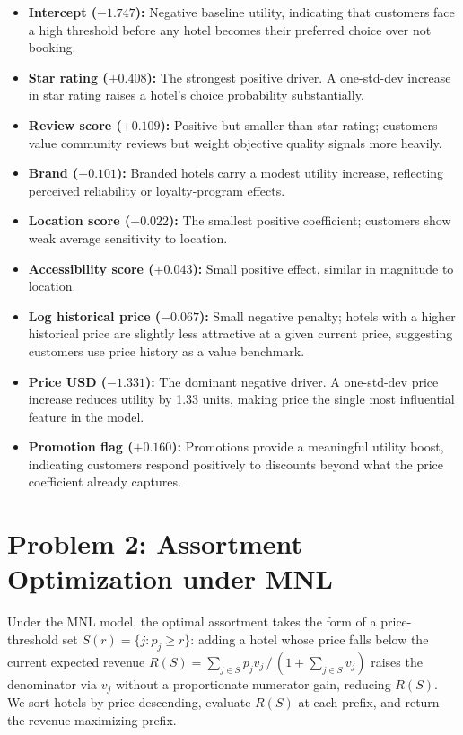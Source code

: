\documentclass[11pt]{article}
\begin{document}
\begin{itemize}
  \item \textbf{Intercept ($-1.747$):} Negative baseline utility, indicating that customers face a high threshold before any hotel becomes their preferred choice over not booking.
  \item \textbf{Star rating ($+0.408$):} The strongest positive driver. A one-std-dev increase in star rating raises a hotel's choice probability substantially.
  \item \textbf{Review score ($+0.109$):} Positive but smaller than star rating; customers value community reviews but weight objective quality signals more heavily.
  \item \textbf{Brand ($+0.101$):} Branded hotels carry a modest utility increase, reflecting perceived reliability or loyalty-program effects.
  \item \textbf{Location score ($+0.022$):} The smallest positive coefficient; customers show weak average sensitivity to location.
  \item \textbf{Accessibility score ($+0.043$):} Small positive effect, similar in magnitude to location.
  \item \textbf{Log historical price ($-0.067$):} Small negative penalty; hotels with a higher historical price are slightly less attractive at a given current price, suggesting customers use price history as a value benchmark.
  \item \textbf{Price USD ($-1.331$):} The dominant negative driver. A one-std-dev price increase reduces utility by 1.33 units, making price the single most influential feature in the model.
  \item \textbf{Promotion flag ($+0.160$):} Promotions provide a meaningful utility boost, indicating customers respond positively to discounts beyond what the price coefficient already captures.
\end{itemize}

\section{Problem 2: Assortment Optimization under MNL}

Under the MNL model, the optimal assortment takes the form of a price-threshold set $S(r) = \{j : p_j \ge r\}$: adding a hotel whose price falls below the current expected revenue $R(S) = \sum_{j \in S} p_j v_j \,/\, (1 + \sum_{j \in S} v_j)$ raises the denominator via $v_j$ without a proportionate numerator gain, reducing $R(S)$. We sort hotels by price descending, evaluate $R(S)$ at each prefix, and return the revenue-maximizing prefix.
\end{document}
